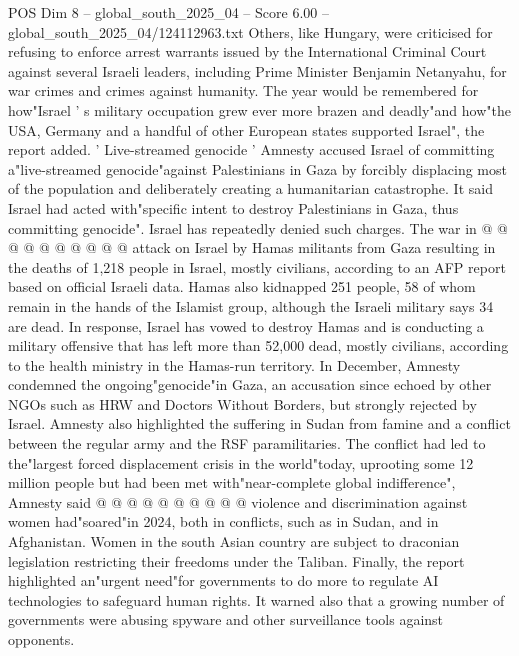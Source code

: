 \begin{textsample}{POS Dim 8 – global\_south\_2025\_04 – Score 6.00 – global\_south\_2025\_04/124112963.txt}
Others, like Hungary, were criticised for refusing to enforce arrest warrants issued by the International Criminal Court against several Israeli leaders, including Prime Minister Benjamin Netanyahu, for war crimes and crimes against humanity.
The year would be remembered for how"Israel ' s military occupation grew ever more brazen and deadly"and how"the USA, Germany and a handful of other European states supported Israel", the report added. ' Live-streamed genocide ' Amnesty accused Israel of committing a"live-streamed genocide"against Palestinians in Gaza by forcibly displacing most of the population and deliberately creating a humanitarian catastrophe.
It said Israel had acted with"specific intent to destroy Palestinians in Gaza, thus committing genocide".
Israel has repeatedly denied such charges.
The war in @ @ @ @ @ @ @ @ @ @ attack on Israel by Hamas militants from Gaza resulting in the deaths of 1,218 people in Israel, mostly civilians, according to an AFP report based on official Israeli data.
Hamas also kidnapped 251 people, 58 of whom remain in the hands of the Islamist group, although the Israeli military says 34 are dead.
In response, Israel has vowed to destroy Hamas and is conducting a military offensive that has left more than 52,000 dead, mostly civilians, according to the health ministry in the Hamas-run territory.
In December, Amnesty condemned the ongoing"genocide"in Gaza, an accusation since echoed by other NGOs such as HRW and Doctors Without Borders, but strongly rejected by Israel.
Amnesty also highlighted the suffering in Sudan from famine and a conflict between the regular army and the RSF paramilitaries.
The conflict had led to the"largest forced displacement crisis in the world"today, uprooting some 12 million people but had been met with"near-complete global indifference", Amnesty said @ @ @ @ @ @ @ @ @ @ violence and discrimination against women had"soared"in 2024, both in conflicts, such as in Sudan, and in Afghanistan.
Women in the south Asian country are subject to draconian legislation restricting their freedoms under the Taliban.
Finally, the report highlighted an"urgent need"for governments to do more to regulate AI technologies to safeguard human rights.
It warned also that a growing number of governments were abusing spyware and other surveillance tools against opponents.

\end{textsample}
